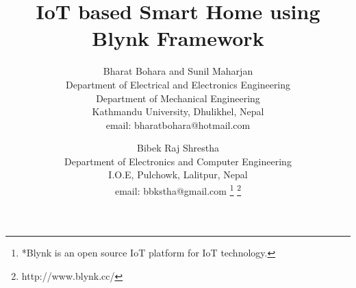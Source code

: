 \documentclass[journal,twoside]{IEEEtran}
\begin{document}
\setcounter{page}{7}
%
\title{IoT based Smart Home using Blynk Framework}
%
%
%

\author{
  Bharat Bohara and Sunil Maharjan\\
  Department of Electrical and Electronics Engineering\\
  Department of Mechanical Engineering\\
  Kathmandu University, Dhulikhel, Nepal\\
  email: bharatbohara@hotmail.com\\
  \and
  \vspace{0.4cm}
  Bibek Raj Shrestha\\
  Department of Electronics and Computer Engineering\\
  I.O.E, Pulchowk, Lalitpur, Nepal\\
  email: bbkstha@gmail.com
  \thanks{*Blynk \cite{Blynk2016} is an open source IoT platform for IoT technology.}%
    \thanks{http://www.blynk.cc/}
}

% 
%
\end{document}

